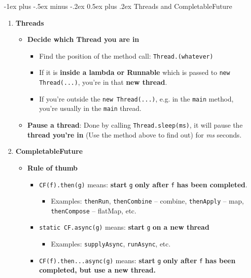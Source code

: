 \documentclass[10pt, landscape]{article}
\makeatletter
\renewcommand{\section}{\@startsection{section}{1}{0mm}%
                                {-1ex plus -.5ex minus -.2ex}%
                                {0.5ex plus .2ex}%
                                {\normalfont\large\bfseries}}
\makeatother
\begin{document}
\begin{multicols}{4}
\section{Threads and CompletableFuture}
\begin{enumerate}
    \item \textbf{Threads}
    \begin{itemize}
        \item \textbf{Decide which Thread you are in}
        \begin{itemize}
            \item Find the position of the method call: \texttt{Thread.(whatever)}
            \item If it is \textbf{inside a lambda or Runnable} which is passed to \texttt{new Thread(...)}, you're in that \textbf{new thread}.
            \item If you're outside the \texttt{new Thread(...)}, e.g. in the \texttt{main} method, you're usually in the \texttt{main} thread.
        \end{itemize}
        \item \textbf{Pause a thread}: Done by calling \texttt{Thread.sleep(ms)}, it will pause the \textbf{thread you're in} (Use the method above to find out) for \textit{ms} seconds.
    \end{itemize}
    \item \textbf{CompletableFuture}
    \begin{itemize}
        \item \textbf{Rule of thumb}
        \begin{itemize}
            \item \texttt{CF(f).then(g)} means: \textbf{start} \texttt{g} \textbf{only after} \texttt{f} \textbf{has been completed}.
            \begin{itemize}
                \item Examples: \texttt{thenRun}, \texttt{thenCombine} -- combine, \texttt{thenApply} -- map, \texttt{thenCompose} -- flatMap, etc.
            \end{itemize}
            \item \texttt{static CF.async(g)} means: \textbf{start} \texttt{g} \textbf{on a new thread}
            \begin{itemize}
                \item Examples: \texttt{supplyAsync}, \texttt{runAsync}, etc.
            \end{itemize}
            \item \texttt{CF(f).then...async(g)} means: \textbf{start} \texttt{g} \textbf{only after} \texttt{f} \textbf{has been completed, but use a new thread.}

\end{itemize}
\end{itemize}
\end{enumerate}
\end{multicols}
\end{document}
